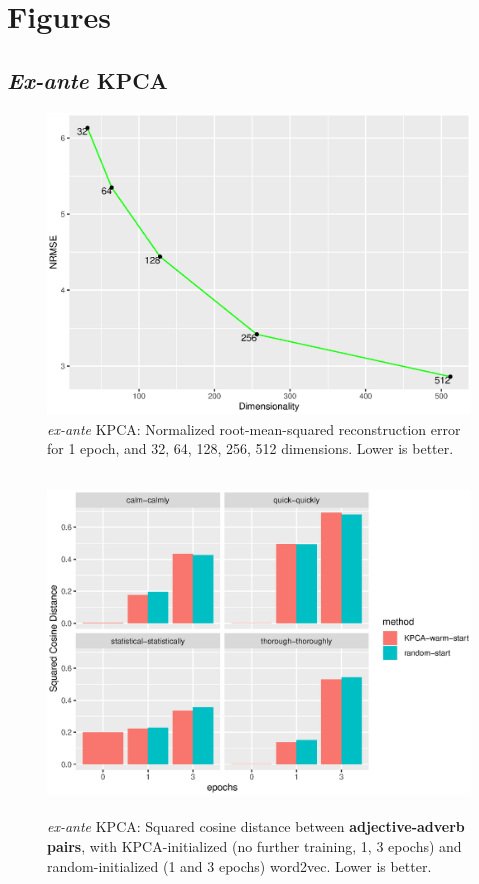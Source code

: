 
\section{Figures}

\subsection{\textit{Ex-ante} KPCA}
\begin{figure}[H]  
\centering
\includegraphics[width=12cm,height=8cm]{./Figures/scree_ante.eps}
\caption{\textit{ex-ante} KPCA: Normalized root-mean-squared reconstruction error for 1 epoch, and 32, 64, 128, 256, 512 dimensions. Lower is better.} 
\label{fig:scree_ante}
\end{figure}


\begin{figure}[H]  
\centering
\includegraphics[width=12cm,height=9cm]{Figures/cos_dist_ante.eps}
\caption{\textit{ex-ante} KPCA: Squared cosine distance between \textbf{adjective-adverb pairs}, with KPCA-initialized (no further training, 1, 3 epochs) and random-initialized (1 and 3 epochs) word2vec. Lower is better.}
\label{fig:cos_dist_ante}
\end{figure}

